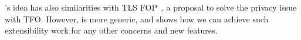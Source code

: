 \tcpls's idea has also similarities with TLS FOP~\cite{sy2020enhanced}, a
proposal to solve the privacy issue with TFO. However, \tcpls is more generic,
and shows how we can achieve such extensibility work for any other concerns and
new features.















